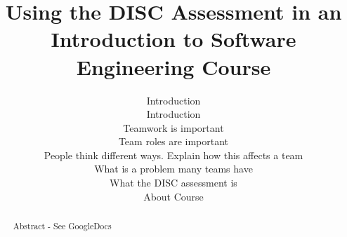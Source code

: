 \documentclass[conference]{IEEEtran}
\begin{document}
\title{Using the DISC Assessment in an Introduction to Software Engineering Course} %

\author{






\maketitle


\begin{abstract}

Abstract - See GoogleDocs


\end{abstract}



\section{Introduction}


Introduction



Teamwork is important

Team roles are important

People think different ways. Explain how this affects a team

What is a problem many teams have



What the DISC assessment is 









\section{About Course}
\label{sec: aboutcourse}

}
\end{document}
